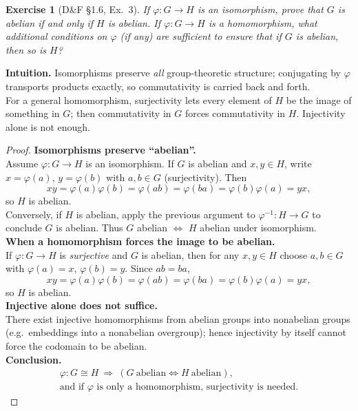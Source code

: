 \documentclass[12pt]{article}
\newtheorem{exercise}[theorem]{Exercise}
\theoremstyle{definition}
\begin{document}
\newpage

\begin{exercise}[D\&F §1.6, Ex.~3]
If $\varphi:G\to H$ is an isomorphism, prove that $G$ is abelian if and only if $H$ is abelian. 
If $\varphi:G\to H$ is a homomorphism, what additional conditions on $\varphi$ (if any) are sufficient to ensure that if $G$ is abelian, then so is $H$?
\end{exercise}

\dotfill

\noindent\textbf{Intuition.}
Isomorphisms preserve \emph{all} group-theoretic structure; conjugating by $\varphi$ transports products exactly, so commutativity is carried back and forth.\\
For a general homomorphism, surjectivity lets every element of $H$ be the image of something in $G$; then commutativity in $G$ forces commutativity in $H$. Injectivity alone is not enough.

\dotfill

\begin{proof}
\noindent\textbf{Isomorphisms preserve “abelian”.}\\
\noindent Assume $\varphi:G\!\to\! H$ is an isomorphism. If $G$ is abelian and $x,y\in H$, write $x=\varphi(a)$, $y=\varphi(b)$ with $a,b\in G$ (surjectivity). Then
\[
xy=\varphi(a)\varphi(b)=\varphi(ab)=\varphi(ba)=\varphi(b)\varphi(a)=yx,
\]
so $H$ is abelian.\\
\noindent Conversely, if $H$ is abelian, apply the previous argument to $\varphi^{-1}:H\!\to\! G$ to conclude $G$ is abelian. Thus $G$ abelian $\Longleftrightarrow$ $H$ abelian under isomorphism.\\

\noindent\textbf{When a homomorphism forces the image to be abelian.}\\
\noindent If $\varphi:G\!\to\! H$ is \emph{surjective} and $G$ is abelian, then for any $x,y\in H$ choose $a,b\in G$ with $\varphi(a)=x$, $\varphi(b)=y$. Since $ab=ba$,
\[
xy=\varphi(a)\varphi(b)=\varphi(ab)=\varphi(ba)=\varphi(b)\varphi(a)=yx,
\]
so $H$ is abelian.\\

\noindent\textbf{Injective alone does not suffice.}\\
\noindent There exist injective homomorphisms from abelian groups into nonabelian groups (e.g.\ embeddings into a nonabelian overgroup); hence injectivity by itself cannot force the codomain to be abelian.\\

\noindent\textbf{Conclusion.}
\[
\boxed{
\begin{array}{c}
\varphi:G\cong H \ \Longrightarrow\ 
(G\ \text{abelian} \iff H\ \text{abelian}),\\[6pt]
\text{and if $\varphi$ is only a homomorphism, surjectivity is needed.}
\end{array}
}
\]

\end{proof}
\end{document}
